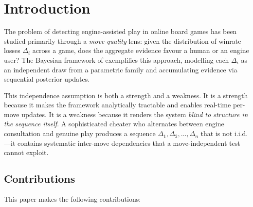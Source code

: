 \documentclass[11pt,a4paper]{article}
\begin{document}
\section{Introduction}
\label{sec:introduction}

The problem of detecting engine-assisted play in online board games has been
studied primarily through a \emph{move-quality} lens: given the distribution
of winrate losses $\Delta_i$ across a game, does the aggregate evidence favour
a human or an engine user? The Bayesian framework of \citet{nguyen2025bayesian}
exemplifies this approach, modelling each $\Delta_i$ as an independent draw
from a parametric family and accumulating evidence via sequential posterior
updates.

This independence assumption is both a strength and a weakness. It is a
strength because it makes the framework analytically tractable and enables
real-time per-move updates. It is a weakness because it renders the system
\emph{blind to structure in the sequence itself}. A sophisticated cheater who
alternates between engine consultation and genuine play produces a sequence
$\Delta_1, \Delta_2, \ldots, \Delta_n$ that is not i.i.d.---it contains
systematic inter-move dependencies that a move-independent test cannot exploit.

\begin{figure}[h]
\centering
{}
\end{figure}

\subsection{Contributions}

This paper makes the following contributions:
\end{document}
